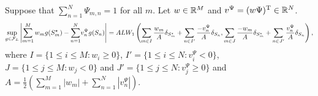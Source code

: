 \begin{proposition}
Suppose that $\sum_{n=1}^N  \Psi_{m,n} = 1$ for all $m$. Let $w \in \mathbb{R}^{M}$ and $v^{\Psi}= (w\Psi)^{\mathrm{T}} \in \mathbb{R}^{N}$.  
\begin{align}
    \sup_{g \in \mathcal{F}_L} \left|\sum_{m=1}^M w_m g(S^{\star}_m) -\sum_{n=1}^N \!v^{\Psi}_n g(S_n)\right| = AL W_1\left(\sum_{m \in I} \frac{w_m}{A} \delta_{S^{\star}_m}  + \sum_{n \in I'} \frac{-v_n^{\Psi}}{A} \delta_{S_n} , \sum_{m \in J} \frac{-w_m}{A} \delta_{S^{\star}_m}  + \sum_{n \in J'} \frac{v_n^{\Psi}}{A} \delta_{S_n}\right),
\end{align}
where $I = \{ 1 \leq i \leq M : w_i \geq 0\}$, $I' = \{1 \leq i \leq N: v_i^{\Psi} < 0\}$,  $J = \{ 1 \leq j \leq M : w_j < 0\}$ and $J' = \{1 \leq j \leq N : v_j^{\Psi} \geq 0\}$ and $A = \frac{1}{2}\left(\sum_{m=1}^M |w_m| + \sum_{n=1}^N |v_n^{\Psi}|\right)$.
\end{proposition}
